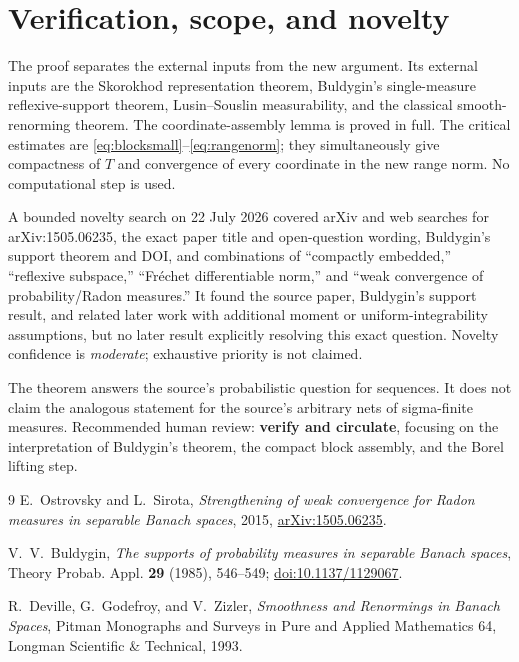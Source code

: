 \documentclass[11pt]{article}
\begin{document}
\section{Verification, scope, and novelty}

The proof separates the external inputs from the new argument.  Its external
inputs are the Skorokhod representation theorem, Buldygin's single-measure
reflexive-support theorem, Lusin--Souslin measurability, and the classical
smooth-renorming theorem.  The coordinate-assembly lemma is proved in full.
The critical estimates are \eqref{eq:blocksmall}--\eqref{eq:rangenorm}; they
simultaneously give compactness of $T$ and convergence of every coordinate in
the new range norm.  No computational step is used.

A bounded novelty search on 22 July 2026 covered arXiv and web searches for
arXiv:1505.06235, the exact paper title and open-question wording, Buldygin's
support theorem and DOI, and combinations of ``compactly embedded,''
``reflexive subspace,'' ``Fr\'echet differentiable norm,'' and ``weak
convergence of probability/Radon measures.''  It found the source paper,
Buldygin's support result, and related later work with additional moment or
uniform-integrability assumptions, but no later result explicitly resolving
this exact question.  Novelty confidence is \emph{moderate}; exhaustive
priority is not claimed.

The theorem answers the source's probabilistic question for sequences.  It
does not claim the analogous statement for the source's arbitrary nets of
sigma-finite measures.  Recommended human review: \textbf{verify and
circulate}, focusing on the interpretation of Buldygin's theorem, the compact
block assembly, and the Borel lifting step.

\small
\begin{thebibliography}{9}
\setlength{\itemsep}{2pt}
E.~Ostrovsky and L.~Sirota,
\emph{Strengthening of weak convergence for Radon measures in separable
Banach spaces}, 2015,
\href{https://arxiv.org/abs/1505.06235}{arXiv:1505.06235}.

V.~V.~Buldygin,
\emph{The supports of probability measures in separable Banach spaces},
Theory Probab. Appl. \textbf{29} (1985), 546--549;
\href{https://doi.org/10.1137/1129067}{doi:10.1137/1129067}.

R.~Deville, G.~Godefroy, and V.~Zizler,
\emph{Smoothness and Renormings in Banach Spaces},
Pitman Monographs and Surveys in Pure and Applied Mathematics 64,
Longman Scientific \& Technical, 1993.
\end{thebibliography}
\end{document}
